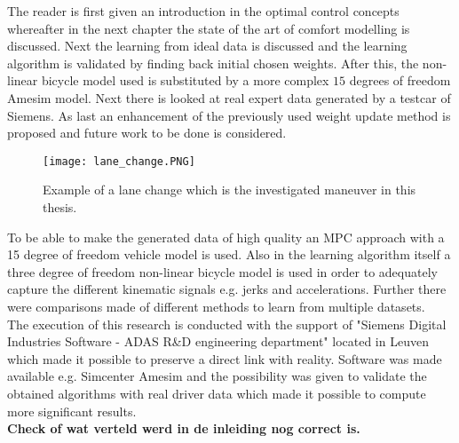The reader is first given an introduction in the optimal control concepts whereafter in the next chapter the state of the art of comfort modelling is discussed. Next the learning from ideal data is discussed and the learning algorithm is validated by finding back initial chosen weights. After this, the non-linear bicycle model used is substituted by a more complex $15$ degrees of freedom Amesim model. Next there is looked at real expert data generated by a testcar of Siemens. As last an enhancement of the previously used weight update method is proposed and future work to be done is considered.
\begin{figure}[htp]
	\centering
	\texttt{[image: lane\_change.PNG]}
	\caption{Example of a lane change which is the investigated maneuver in this thesis.}
	\label{fig:lane_change}
\end{figure}

To be able to make the generated data of high quality an MPC approach with a 15 degree of freedom vehicle model is used. Also in the learning algorithm itself a three degree of freedom non-linear bicycle model is used in order to adequately capture the different kinematic signals e.g. jerks and accelerations. Further there were comparisons made of different methods to learn from multiple datasets. \\

The execution of this research is conducted with the support of "Siemens Digital Industries Software - ADAS R\&D engineering department" located in Leuven which made it possible to preserve a direct link with reality. Software was made available e.g. Simcenter Amesim and the possibility was given to validate the obtained algorithms with real driver data which made it possible to compute more significant results.\\

\textbf{Check of wat verteld werd in de inleiding nog correct is.}

